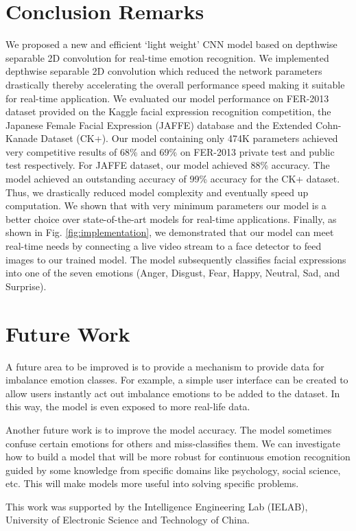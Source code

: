\documentclass[master]{thesis-uestc}
\begin{document}
\section{Conclusion Remarks}
We proposed a new and efficient `light weight' CNN model based on depthwise separable 2D convolution for real-time emotion recognition. We implemented depthwise separable 2D convolution which reduced the network parameters drastically thereby accelerating the overall performance speed making it suitable for real-time application. We evaluated our model performance on FER-2013 dataset provided on the Kaggle facial expression recognition competition, the Japanese Female Facial Expression (JAFFE) database and the Extended Cohn-Kanade Dataset (CK+). Our model containing only 474K parameters achieved very competitive results of 68\% and 69\% on FER-2013 private test and public test respectively. For JAFFE dataset, our model achieved 88\% accuracy. The model achieved an outstanding accuracy of 99\% accuracy for the CK+ dataset. Thus, we drastically reduced model complexity and eventually speed up computation. We shown that with very minimum parameters our model is a better choice over state-of-the-art models for real-time applications. Finally, as shown in Fig. \ref{fig:implementation}, we demonstrated that our model can meet real-time needs by connecting a live video stream to a face detector to feed images to our trained model. The model subsequently classifies facial expressions into one of the seven emotions (Anger, Disgust, Fear, Happy, Neutral, Sad, and Surprise).

\section{Future Work}
A future area to be improved is to provide a mechanism to provide data for imbalance emotion classes. For example, a simple user interface can be created to allow users instantly act out imbalance emotions to be added to the dataset. In this way, the model is even exposed to more real-life data.

Another future work is to improve the model accuracy. The model sometimes confuse certain emotions for others and miss-classifies them. We can investigate how to build a model that will be more robust for continuous emotion recognition guided by some knowledge from specific domains like psychology, social science, etc. This will make models more useful into solving specific problems.

\thesisacknowledgement
This work was supported by the Intelligence Engineering Lab (IELAB), University of Electronic Science and Technology of China.
\end{document}
